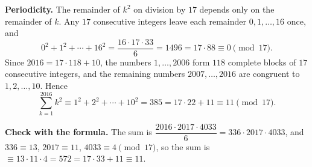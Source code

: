 \textbf{Periodicity.} The remainder of $k^2$ on division by $17$ depends only on the remainder of $k$. Any $17$ consecutive integers leave each remainder $0,1,\dots,16$ once, and
\[0^2+1^2+\cdots+16^2=\dfrac{16\cdot17\cdot33}{6}=1496=17\cdot88\equiv0\pmod{17}.\]
Since $2016=17\cdot118+10$, the numbers $1,\dots,2006$ form $118$ complete blocks of $17$ consecutive integers, and the remaining numbers $2007,\dots,2016$ are congruent to $1,2,\dots,10$. Hence
\[\sum_{k=1}^{2016}k^2\equiv1^2+2^2+\cdots+10^2=385=17\cdot22+11\equiv\boxed{11}\pmod{17}.\]

\textbf{Check with the formula.} The sum is $\dfrac{2016\cdot2017\cdot4033}{6}=336\cdot2017\cdot4033$, and $336\equiv13$, $2017\equiv11$, $4033\equiv4\pmod{17}$, so the sum is $\equiv13\cdot11\cdot4=572=17\cdot33+11\equiv11$.
